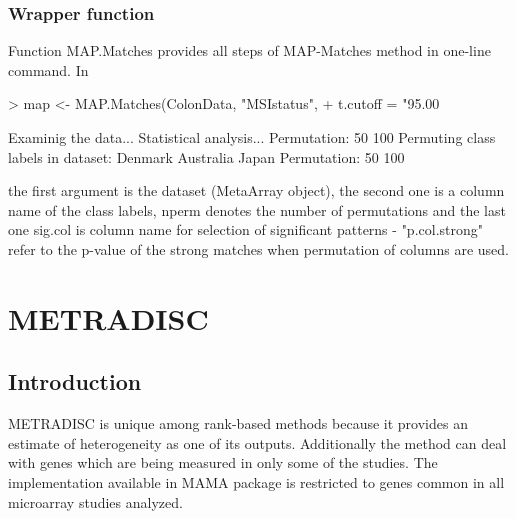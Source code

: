 \documentclass[a4paper]{report}
\begin{document}
\subsection*{Wrapper function}
Function {\ttfamily MAP.Matches} provides all steps of MAP-Matches method in one-line command. In
\begin{Schunk}
\begin{Sinput}
> map <- MAP.Matches(ColonData, "MSIstatus", 
+ t.cutoff = "95.00%
\end{Sinput}
\begin{Soutput}
Examinig the data...
Statistical analysis...
Permutation: 
50 
100 
Permuting class labels in dataset: 
Denmark 
Australia 
Japan 
Permutation: 
50 
100 
\end{Soutput}
\end{Schunk}
the first argument is the dataset (MetaArray object), the second one is a column name of the class labels, {\ttfamily nperm} denotes the number of permutations and the last one {\ttfamily sig.col} is column name for selection of significant patterns - {\ttfamily "p.col.strong"} refer to the p-value of the strong matches when permutation of columns are used.

\chapter{METRADISC}
\section*{Introduction}
METRADISC \cite{Zintzaraz} is unique among rank-based methods because it provides an estimate of heterogeneity as one of its outputs. Additionally the method can deal with genes which are being measured in only some of the studies. The implementation available in MAMA package is restricted to genes common in all microarray studies analyzed.
\end{document}
